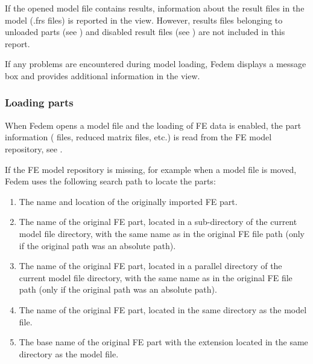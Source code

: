 If the opened model file contains results, information about the
result files in the model (.frs files) is reported in the \OutputList view.
However, results files belonging to unloaded parts
(see )
and disabled result files
(see )
are not included in this report.

If any problems are encountered during model loading, Fedem displays
a message box and provides additional information in the \OutputList view.



\subsubsection{Loading parts}

When Fedem opens a model file and the loading of FE data is enabled,
the part information ( files, reduced matrix files, etc.)
is read from the FE model repository,
see .

If the FE model repository is missing, for example when a model
file is moved, Fedem uses the following search path to locate the parts:

\begin{enumerate}
\item The name and location of the originally imported FE part.
\item The name of the original FE part, located in a sub-directory
  of the current model file directory, with the same name as in the
  original FE file path (only if the original path was an absolute path).
\item The name of the original FE part, located in a parallel
  directory of the current model file directory, with the same name as in the
  original FE file path (only if the original path was an absolute path).
\item The name of the original FE part, located in the same
  directory as the model file.
\item The base name of the original FE part with the extension 
  located in the same directory as the model file.
\end{enumerate}


